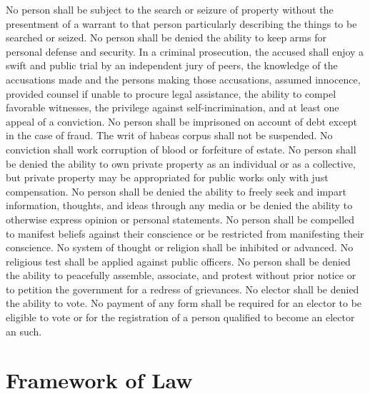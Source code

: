\documentclass{article}
\begin{document}
No person shall be subject to the search or seizure of property without the presentment of a warrant to that person particularly describing the things to be searched or seized.
No person shall be denied the ability to keep arms for personal defense and security.
In a criminal prosecution, the accused shall enjoy a swift and public trial by an independent jury of peers, the knowledge of the accusations made and the persons making those accusations, assumed innocence, provided counsel if unable to procure legal assistance, the ability to compel favorable witnesses, the privilege against self-incrimination, and at least one appeal of a conviction.
No person shall be imprisoned on account of debt except in the case of fraud.
The writ of habeas corpus shall not be suspended. No conviction shall work corruption of blood or forfeiture of estate.
No person shall be denied the ability to own private property as an individual or as a collective, but private property may be appropriated for public works only with just compensation.
No person shall be denied the ability to freely seek and impart information, thoughts, and ideas through any media or be denied the ability to otherwise express opinion or personal statements. 
No person shall be compelled to manifest beliefs against their conscience or be restricted from manifesting their conscience. 
No system of thought or religion shall be inhibited or advanced. No religious test shall be applied against public officers.
No person shall be denied the ability to peacefully assemble, associate, and protest without prior notice or to petition the government for a redress of grievances.
No elector shall be denied the ability to vote. No payment of any form shall be required for an elector to be eligible to vote or for the registration of a person qualified to become an elector an such.
\section{Framework of Law}
\end{document}
